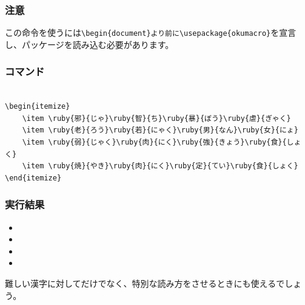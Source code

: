 \documentclass[a4j, titlepage]{jarticle}
\begin{document}
\subsubsection*{注意}
この命令を使うには\verb|\begin{document}より前に|\verb|\usepackage{okumacro}|を宣言し、パッケージを読み込む必要があります。

\begin{multicols}{2}

\subsubsection*{コマンド}
\begin{lstlisting}

\begin{itemize}
    \item \ruby{邪}{じゃ}\ruby{智}{ち}\ruby{暴}{ぼう}\ruby{虐}{ぎゃく}
    \item \ruby{老}{ろう}\ruby{若}{にゃく}\ruby{男}{なん}\ruby{女}{にょ}
    \item \ruby{弱}{じゃく}\ruby{肉}{にく}\ruby{強}{きょう}\ruby{食}{しょく}
    \item \ruby{焼}{やき}\ruby{肉}{にく}\ruby{定}{てい}\ruby{食}{しょく}
\end{itemize}
\end{lstlisting}

\vfill\null
\columnbreak

\subsubsection*{実行結果}
\begin{screen}

    \begin{itemize}
        \item {}
        \item {}
        \item {}
        \item {}
    \end{itemize}
\end{screen}
\end{multicols}

難しい漢字に対してだけでなく、特別な読み方をさせるときにも使えるでしょう。
\end{document}
